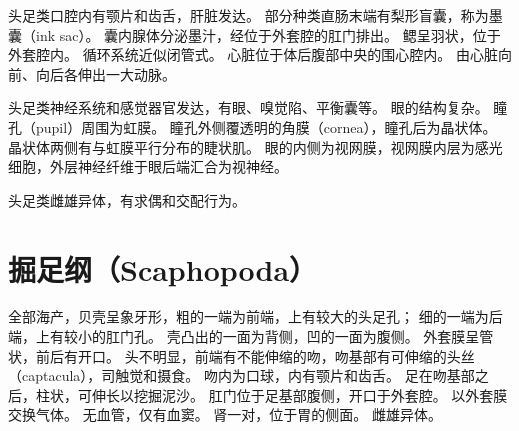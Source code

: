 \documentclass[11pt]{article}
\begin{document}
\newline

头足类口腔内有颚片和齿舌，肝脏发达。
部分种类直肠末端有梨形盲囊，称为墨囊（ink sac）。
囊内腺体分泌墨汁，经位于外套腔的肛门排出。
鳃呈羽状，位于外套腔内。
循环系统近似闭管式。
心脏位于体后腹部中央的围心腔内。
由心脏向前、向后各伸出一大动脉。

\newline

头足类神经系统和感觉器官发达，有眼、嗅觉陷、平衡囊等。
眼的结构复杂。
瞳孔（pupil）周围为虹膜。
瞳孔外侧覆透明的角膜（cornea），瞳孔后为晶状体。
晶状体两侧有与虹膜平行分布的睫状肌。
眼的内侧为视网膜，视网膜内层为感光细胞，外层神经纤维于眼后端汇合为视神经。

\newline

头足类雌雄异体，有求偶和交配行为。
  
\section{掘足纲（Scaphopoda）}
全部海产，贝壳呈象牙形，粗的一端为前端，上有较大的头足孔；
细的一端为后端，上有较小的肛门孔。
壳凸出的一面为背侧，凹的一面为腹侧。
外套膜呈管状，前后有开口。
头不明显，前端有不能伸缩的吻，吻基部有可伸缩的头丝（captacula），司触觉和摄食。
吻内为口球，内有颚片和齿舌。
足在吻基部之后，柱状，可伸长以挖掘泥沙。
肛门位于足基部腹侧，开口于外套腔。
以外套膜交换气体。
无血管，仅有血窦。
肾一对，位于胃的侧面。
雌雄异体。
  
\end{document}
